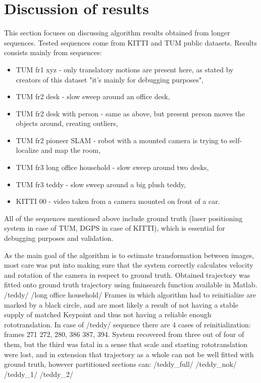 \chapter{Discussion of results}

This section focuses on discussing algorithm results obtained from longer sequences. Tested sequences come from KITTI and TUM public datasets. Results consists mainly from sequences:
\begin{itemize}
	\item TUM fr1 xyz - only translatory motions are present here, as stated by creators of this dataset "it's mainly for debugging purposes",
	\item TUM fr2 desk - slow sweep around an office desk,
	\item TUM fr2 desk with person - same as above, but present person moves the objects around, creating outliers,
	\item TUM fr2 pioneer SLAM - robot with a mounted camera is trying to self-localize and map the room,
	\item TUM fr3 long office household - slow sweep around two desks,
	\item TUM fr3 teddy - slow sweep around a big plush teddy,
	\item KITTI 00 - video taken from a camera mounted on front of a car.
\end{itemize}
All of the sequences mentioned above include ground truth (laser positioning system in case of TUM, DGPS in case of KITTI), which is essential for debugging purposes and validation.


As the main goal of the algorithm is to estimate transformation between images, most care was put into making sure that the system correctly calculates velocity and rotation of the camera in respect to ground truth. Obtained trajectory was fitted onto ground truth trajectory using fminsearch function available in Matlab.
/teddy/
/long office household/
Frames in which algorithm had to reinitialize are marked by a black circle, and are most likely a result of not having a stable supply of matched Keypoint and thus not having a reliable enough rototranslation. In case of /teddy/ sequence there are 4 cases of reinitialization: frames 271 272, 280, 386 387, 394. System recovered from three out of four of them, but the third was fatal in a sense that scale and starting rototranslation were lost, and in extension that trajectory as a whole can not be well fitted with ground truth, however partitioned sections can:
/teddy\_full/
/teddy\_nok/
/teddy\_1/
/teddy\_2/

